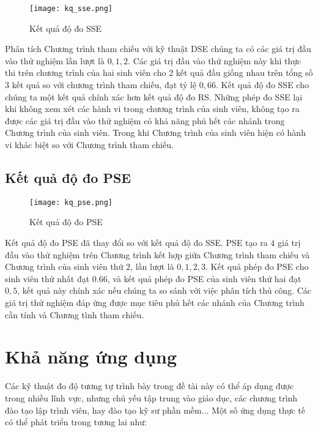 \begin{center}
  \begin{figure}[H]
    \begin{center}
      \texttt{[image: kq\_sse.png]}
    \end{center}
    \caption{Kết quả độ đo SSE}
  \end{figure}
\end{center}

Phân tích Chương trình tham chiếu với kỹ thuật DSE chúng ta có các giá
trị đầu vào thử nghiệm lần lượt là $0, 1, 2$. Các giá trị đầu vào thử
nghiệm này khi thực thi trên chương trình của hai sinh viên cho 2 kết
quả đầu giống nhau trên tổng số 3 kết quả so với chương trình tham
chiếu, đạt tỷ lệ $0,66$. Kết quả độ đo SSE cho chúng ta một kết quả
chính xác hơn kết quả độ đo RS. Những phép đo SSE lại khi không xem
xét các hành vi trong chương trình của sinh viên, không tạo ra được
các giá trị đầu vào thử nghiệm có khả năng phủ hết các nhánh trong
Chương trình của sinh viên. Trong khi Chương trình của sinh viên hiện
có hành vi khác biệt so với Chương trình tham chiếu.

\subsection{Kết quả độ đo PSE}
\begin{center}
	\begin{figure}[H]
		\begin{center}
			\texttt{[image: kq\_pse.png]}
		\end{center}
		\caption{Kết quả độ đo PSE}		
	\end{figure}
\end{center}

Kết quả độ đo PSE đã thay đổi so với kết quả độ đo SSE. PSE tạo ra $4$
giá trị đầu vào thử nghiệm trên Chương trình kết hợp giữa Chương trình
tham chiếu và Chương trình của sinh viên thứ $2$, lần lượt là
$0, 1, 2, 3$. Kết quả phép đo PSE cho sinh viên thứ nhất đạt $0.66$,
và kết quả phép đo PSE của sinh viên thứ hai đạt $0,5$, kết quả này
chính xác nếu chúng ta so sánh với việc phân tích thủ công. Các giá
trị thử nghiệm đáp ứng được mục tiêu phủ hết các nhánh của Chương
trình cần tính và Chương tình tham chiếu.

\section{Khả năng ứng dụng}

Các kỹ thuật đo độ tương tự trình bày trong đề tài này có thể áp dụng
được trong nhiều lĩnh vực, nhưng chủ yếu tập trung vào giáo dục, các
chương trình đào tạo lập trình viên, hay đào tạo kỹ sư phần mềm... Một
số ứng dụng thực tế có thể phát triển trong tương lai như:

